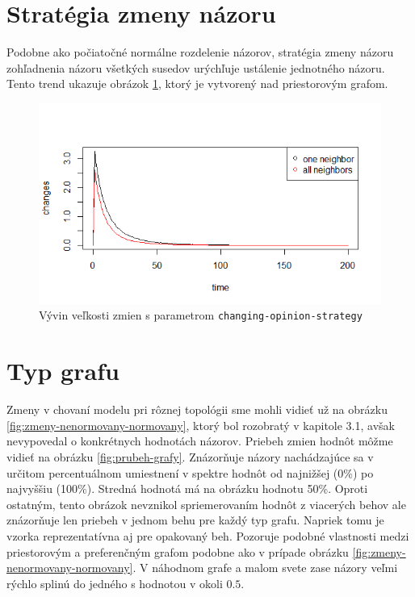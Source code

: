 \documentclass[10pt,a4paper]{report}
\begin{document}
\section{Stratégia zmeny názoru}
Podobne ako počiatočné normálne rozdelenie názorov, stratégia zmeny názoru zohľadnenia názoru všetkých susedov urýchľuje ustálenie jednotného názoru. Tento trend ukazuje obrázok \ref{fig:zmeny-strategie}, ktorý je vytvorený nad priestorovým grafom.  
\begin{figure}
  \includegraphics[width=\textwidth]{plots/random-g/randomAllVsOne.png}
  \caption{Vývin veľkosti zmien s parametrom \texttt{changing-opinion-strategy} }
  \label{fig:zmeny-strategie}
\end{figure}

\section{Typ grafu}
Zmeny v chovaní modelu pri rôznej topológii sme mohli vidieť už na obrázku \ref{fig:zmeny-nenormovany-normovany}, ktorý bol rozobratý v kapitole 3.1, avšak nevypovedal o konkrétnych hodnotách názorov. Priebeh zmien hodnôt môžme vidieť na obrázku \ref{fig:prubeh-grafy}. Znázorňuje názory nachádzajúce sa v určitom percentuálnom umiestnení v spektre hodnôt od najnižšej (0\%) po najvyššiu (100\%). Stredná hodnotá má na obrázku hodnotu 50\%. Oproti ostatným, tento obrázok nevznikol spriemerovaním hodnôt z viacerých behov ale znázorňuje len priebeh v jednom behu pre každý typ grafu. Napriek tomu je vzorka reprezentatívna aj pre opakovaný beh. Pozoruje podobné vlastnosti medzi priestorovým a preferenčným grafom podobne ako v prípade obrázku \ref{fig:zmeny-nenormovany-normovany}. V náhodnom grafe a malom svete zase názory veľmi rýchlo splinú do jedného s hodnotou v okoli $0.5$.
\end{document}
